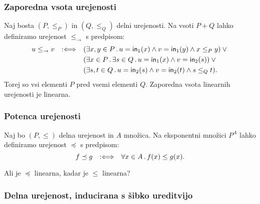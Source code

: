 \subsubsection{Zaporedna vsota urejenosti}

Naj bosta $(P, \leq_P)$ in $(Q, \leq_Q)$ delni urejenosti. Na vsoti $P + Q$ lahko definiramo urejenost $\leq_{\to}$ s predpisom:
%
\begin{equation*}
  u \leq_{\to} v \quad {{:}{\Longleftrightarrow}}\quad
  \begin{aligned}[t]
    &(\exists x, y \in P \,.\, u = \mathsf{in}_{1}(x) \land v = \mathsf{in}_{1}(y) \land x \leq_P y) \lor {} \\
    &(\exists x \in P \,.\, \exists s \in Q \,.\, u = \mathsf{in}_{1}(x) \land v = \mathsf{in}_{2}(s)) \lor {} \\
    &(\exists s, t \in Q \,.\, u = \mathsf{in}_{2}(s) \land v = \mathsf{in}_{2}(t) \land s \leq_Q t).
  \end{aligned}
\end{equation*}
%
Torej so vsi elementi $P$ pred vsemi elementi $Q$. Zaporedna vsota linearnih urejenosti je linearna.


\subsubsection{Potenca urejenosti}

Naj bo $(P, \leq)$ delna urejenost in $A$ množica. Na eksponentni množici $P^A$ lahko definiramo urejenost $\preceq$ s predpisom:
%
\begin{equation*}
  f \preceq g \quad {{:}{\Longleftrightarrow}}\quad \forall x \in A \,.\, f(x) \leq g(x).
\end{equation*}

\begin{naloga}
  Ali je $\preceq$ linearna, kadar je $\leq$ linearna?
\end{naloga}


\subsubsection{Delna urejenost, inducirana s šibko ureditvijo}

